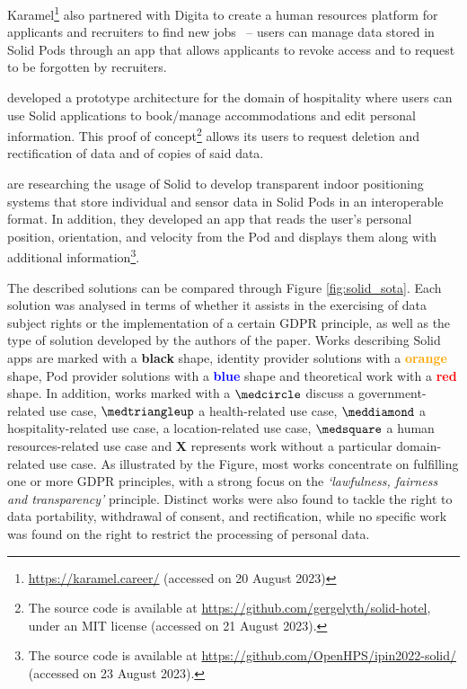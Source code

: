 Karamel\footnote{\url{https://karamel.career/} (accessed on 20 August 2023)} also partnered with Digita to create a human resources platform for applicants and recruiters to find new jobs~\citep{verstraete_solid_2022} -- users can manage data stored in Solid Pods through an app that allows applicants to revoke access and to request to be forgotten by recruiters.

\cite{toth_preserving_2022} developed a prototype architecture for the domain of hospitality where users can use Solid applications to book/manage accommodations and edit personal information. This proof of concept\footnote{The source code is available at \url{https://github.com/gergelyth/solid-hotel}, under an MIT license (accessed on 21 August 2023).} allows its users to request deletion and rectification of data and of copies of said data.

\cite{van_de_wynckel_solidbased_2022} are researching the usage of Solid to develop transparent indoor positioning systems that store individual and sensor data in Solid Pods in an interoperable format. In addition, they developed an app that reads the user’s personal position, orientation, and velocity from the Pod and displays them along with additional information\footnote{The source code is available at \url{https://github.com/OpenHPS/ipin2022-solid/} (accessed on 23 August 2023).}.

The described solutions can be compared through Figure \ref{fig:solid_sota}.
Each solution was analysed in terms of whether it assists in the exercising of data subject rights or the implementation of a certain GDPR principle, as well as the type of solution developed by the authors of the paper.
Works describing Solid apps are marked with a \textbf{black} shape, identity provider solutions with a \textbf{\textcolor{orange}{orange}} shape, Pod provider solutions with a \textbf{\textcolor{blue}{blue}} shape and theoretical work with a \textbf{\textcolor{red}{red}} shape.
In addition, works marked with a $\medcircle$ discuss a government-related use case, $\medtriangleup$ a health-related use case, $\meddiamond$ a hospitality-related use case, \faStarO\space a location-related use case, $\medsquare$ a human resources-related use case and \textbf{X} represents work without a particular domain-related use case.
As illustrated by the Figure, most works concentrate on fulfilling one or more GDPR principles, with a strong focus on the \textit{`lawfulness, fairness and transparency'} principle.
Distinct works were also found to tackle the right to data portability, withdrawal of consent, and rectification, while no specific work was found on the right to restrict the processing of personal data. 

